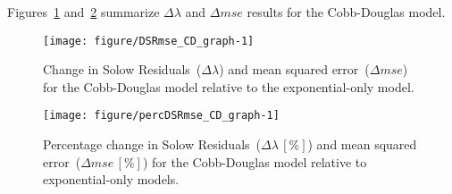 \documentclass[preprint,authoryear,12pt]{elsarticle}\usepackage[]{graphicx}\usepackage[]{color}
\makeatletter
\def\maxwidth{ %
  \ifdim\Gin@nat@width>\linewidth
    \linewidth
  \else
    \Gin@nat@width
  \fi
}
\newenvironment{knitrout}{}{} %
\makeatother
\begin{document}
%
Figures~\ref{fig:DSRmse_CD_graph} and~\ref{fig:percDSRmse_CD_graph} summarize 
$\Delta \lambda$ and $\Delta mse$ 
results for the Cobb-Douglas model.
%
\begin{knitrout}
\color{fgcolor}\begin{figure}[H]

{\centering \texttt{[image: figure/DSRmse\_CD\_graph-1]} 

}

\caption[Change in Solow Residuals~(]{Change in Solow Residuals~($\Delta\lambda$) and mean squared error~($\Delta mse$) for the Cobb-Douglas model relative to the exponential-only model.}\label{fig:DSRmse_CD_graph}
\end{figure}


\end{knitrout}
%
\begin{knitrout}
\color{fgcolor}\begin{figure}[H]

{\centering \texttt{[image: figure/percDSRmse\_CD\_graph-1]} 

}

\caption[Percentage change in Solow Residuals~(]{Percentage change in Solow Residuals~($\Delta\lambda \, [\%]$) and mean squared error~($\Delta mse \, [\%]$) for the Cobb-Douglas model relative to exponential-only models.}\label{fig:percDSRmse_CD_graph}
\end{figure}


\end{knitrout}
%
\end{document}
